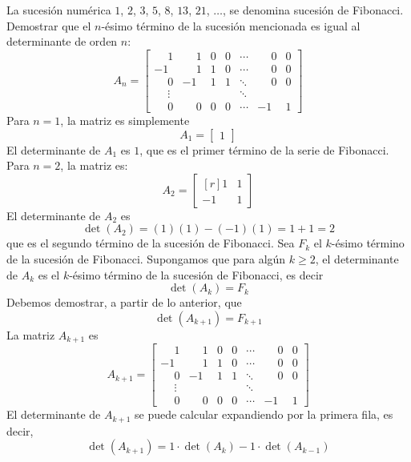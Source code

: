\begin{example}
    La sucesión numérica $1$, $2$, $3$, $5$, $8$, $13$, $21$, $\dots$, se denomina sucesión de Fibonacci. Demostrar que el $n$-ésimo término de la sucesión mencionada es igual al determinante de orden $n$:
    $$A_n = \begin{bmatrix}
        \phantom{-}1 & \phantom{-}1 & 0 & 0 & \cdots & \phantom{-}0 & 0 \\
        -1 & \phantom{-}1 & 1 & 0 & \cdots & \phantom{-}0 & 0 \\
        \phantom{-}0 & -1 & 1 & 1 & \ddots & \phantom{-}0 & 0 \\
        \phantom{-}\vdots & & & & \ddots & & \\
        \phantom{-}0 & \phantom{-}0 & 0 & 0 & \cdots & -1 & 1
    \end{bmatrix}$$\newpage
    \demostracion Para $n = 1$, la matriz es simplemente
    $$A_1 = \begin{bmatrix} 1 \end{bmatrix}$$
    El determinante de $A_1$ es $1$, que es el primer término de la serie de Fibonacci.
    Para $n = 2$, la matriz es:
    $$A_2 = \begin{bmatrix*}[r]
        1 & 1 \\
        -1 & 1
    \end{bmatrix*}$$
    El determinante de $A_2$ es
    $$\det(A_2) = (1)(1) - (-1)(1) = 1 + 1 = 2$$
    que es el segundo término de la sucesión de Fibonacci. Sea $F_k$ el $k$-ésimo término de la sucesión de Fibonacci. Supongamos que para algún $k \geq 2$, el determinante de $A_k$ es el $k$-ésimo término de la sucesión de Fibonacci, es decir
    $$\det(A_k) = F_k$$
    Debemos demostrar, a partir de lo anterior, que
    $$\det(A_{k+1}) = F_{k+1}$$
    La matriz $A_{k+1}$ es
    $$A_{k+1} = \begin{bmatrix}
        \phantom{-}1 & \phantom{-}1 & 0 & 0 & \cdots & \phantom{-}0 & 0 \\
        -1 & \phantom{-}1 & 1 & 0 & \cdots & \phantom{-}0 & 0 \\
        \phantom{-}0 & -1 & 1 & 1 & \ddots & \phantom{-}0 & 0 \\
        \phantom{-}\vdots & & & & \ddots & & \\
        \phantom{-}0 & \phantom{-}0 & 0 & 0 & \cdots & -1 & 1
    \end{bmatrix}$$
    El determinante de $A_{k+1}$ se puede calcular expandiendo por la primera fila, es decir,
    $$\det(A_{k+1}) = 1 \cdot \det(A_k) - 1 \cdot \det(A_{k-1})$$

\end{example}
